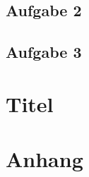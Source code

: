\documentclass[a4paper,11pt,oneside]{book}
\begin{document}
\section{Aufgabe 2}
\section{Aufgabe 3}

\clearpage

\chapter{Titel}
\clearpage




\appendix		%
\chapter{Anhang}

\backmatter		%
\clearpage
\end{document}
